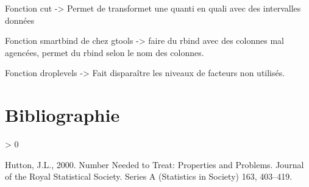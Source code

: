 \documentclass[
]{article}
\newlength{\cslhangindent}
\newenvironment{CSLReferences}[2] %
 {%
  \setlength{\parindent}{0pt}
  \ifodd #1 \everypar{\setlength{\hangindent}{\cslhangindent}}\ignorespaces\fi
  \ifnum #2 > 0
  \setlength{\parskip}{#2\baselineskip}
  \fi
 }%
 {}
\begin{document}
Fonction cut -\textgreater{} Permet de transformet une quanti en quali
avec des intervalles données

Fonction smartbind de chez gtools -\textgreater{} faire du rbind avec
des colonnes mal agencées, permet du rbind selon le nom des colonnes.

Fonction droplevels -\textgreater{} Fait disparaître les niveaux de
facteurs non utilisés.

\pagebreak

\hypertarget{bibliographie}{%
\section*{Bibliographie}\label{bibliographie}}

\hypertarget{refs}{}
\begin{CSLReferences}{1}{0}
\leavevmode\hypertarget{ref-hutton_number_2000}{}%
Hutton, J.L., 2000. Number {Needed} to {Treat}: {Properties} and
{Problems}. Journal of the Royal Statistical Society. Series A
(Statistics in Society) 163, 403--419.

\end{CSLReferences}
\end{document}
